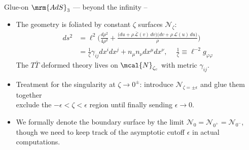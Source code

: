 \documentclass[
	10pt
	,handout
	,noamsthm
]{beamer}
\newcommand{\TTbar}{\texorpdfstring{\ensuremath{T\bar{T}}}{TTbar}\xspace}
\begin{document}
\begin{frame}{Glue-on $\mrm{AdS}_3$ --- beyond the infinity}{%
	\textcite{Apolo:2023vnm} -- 
}
\begin{itemize}
\item The geometry is foliated by constant $\zeta$ surfaces ${\mathcal N}_\zeta$:
	\begin{equation}
	\begin{aligned}
		ds^2 
		&= \ell^2 \bigg( \frac{d\rho^2}{4 \rho^2} + \frac{ \big( du + \rho \, \mathcal {\bar L}(v)\, dv \big) \big( dv + \rho \, \mathcal L(u)\, du \big) }{\rho} \bigg) \\
		&= \frac{1}{\zeta} \gamma_{ij}dx^i dx^j+n_\mu n_\nu dx^\mu dx^\nu,\ \quad
	\frac{1}{\zeta} \equiv \ell^{-2} g_{\varphi\varphi}
	\end{aligned}
	\end{equation}
	The \TTbar deformed theory lives on $\mcal{N}_{\zeta_c}$ with metric $\gamma_{ij}$.
	
\pause
\item Treatment for the singularity at $\zeta\to 0^\pm$: introduce $\mathcal N_{\zeta={\pm\epsilon}}$ and glue them together\\
	exclude the $-\epsilon < \zeta < \epsilon$ region until finally sending $\epsilon \to 0$. 
\item We formally denote the boundary surface by the limit $\mathcal N_{0}=\mathcal N_{0^+}=\mathcal N_{0^-}$, though we need to keep track of the asymptotic cutoff $\epsilon$ in actual computations.
\end{itemize}
\end{frame}

\newcommand{\stateGlueon}{\ensuremath{
	\textrm{Cutoff / \textit{glue-on} $\mrm{AdS}_{d+1}$ Gravity}
	\ \equiv\ %
	\textrm{\TTbar deformed $\mrm{CFT}_{d}$ at $\mcal{N}_{\zeta_c}$}\qquad
}}
\end{document}
